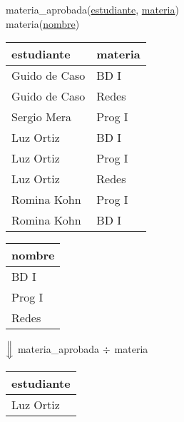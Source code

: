\documentclass[preview]{standalone}
\begin{document}
materia\_aprobada(\underline{estudiante}, \underline{materia})\\
materia(\underline{nombre})

\begin{center}
\begin{tabular}{ | l | l |}\hline
	estudiante & materia \\\hline			
	Guido de Caso & BD I  \\
	Guido de Caso & Redes  \\
	Sergio Mera & Prog I  \\
	Luz Ortiz & BD I  \\
	Luz Ortiz & Prog I  \\
	Luz Ortiz & Redes  \\
	Romina Kohn & Prog I  \\
	Romina Kohn & BD I  \\\hline
\end{tabular}
\quad
\begin{tabular}{| l |}\hline
	nombre \\\hline			
	BD I \\
	Prog I \\
	Redes \\\hline
\end{tabular}
\vspace{.35cm}

$\Big\Downarrow$ materia\_aprobada ${\Large \div}$ materia
\vspace{.35cm}

\begin{tabular}{| l |}\hline
	estudiante \\\hline			
	Luz Ortiz \\\hline
\end{tabular}
\end{center}
\end{document}
